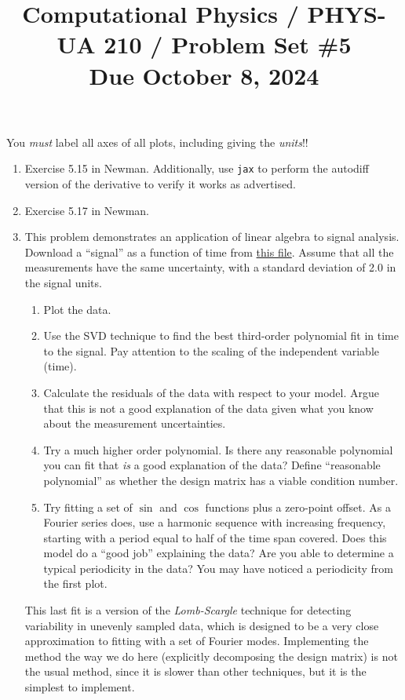\documentclass[11pt, preprint]{aastex}
\begin{document}
\title{\bf Computational Physics / PHYS-UA 210 / Problem Set \#5
\\ Due October 8, 2024 }

You {\it must} label all axes of all plots, including giving the {\it
  units}!!

\begin{enumerate}
  \item Exercise 5.15 in Newman. Additionally, use {\tt jax} to
    perform the autodiff version of the derivative to verify it works
    as advertised.
  \item Exercise 5.17 in Newman.
  \item This problem demonstrates an application of linear algebra to
    signal analysis. Download a ``signal'' as a function of time from
    \href{https://github.com/blanton144/computational-grad/blob/main/data/signal.dat}{this
      file}. Assume that all the measurements have the same
    uncertainty, with a standard deviation of 2.0 in the signal units.
    \begin{enumerate}
      \item Plot the data.
      \item Use the SVD technique to find the best third-order
        polynomial fit in time to the signal. Pay attention to the
        scaling of the independent variable (time).
      \item Calculate the residuals of the data with respect to your
        model. Argue that this is not a good explanation of the data
        given what you know about the measurement uncertainties.
      \item Try a much higher order polynomial. Is there any
        reasonable polynomial you can fit that {\it is} a good
        explanation of the data? Define ``reasonable polynomial'' as
        whether the design matrix has a viable condition number.
      \item Try fitting a set of $\sin$ and $\cos$ functions plus a
        zero-point offset. As a Fourier series does, use a harmonic
        sequence with increasing frequency, starting with a period
        equal to half of the time span covered. Does this model do a
        ``good job'' explaining the data? Are you able to determine a
        typical periodicity in the data? You may have noticed a
        periodicity from the first plot.
    \end{enumerate}
    This last fit is a version of the {\it Lomb-Scargle} technique for
    detecting variability in unevenly sampled data, which is designed
    to be a very close approximation to fitting with a set of Fourier
    modes. Implementing the method the way we do here (explicitly
    decomposing the design matrix) is not the usual method, since it
    is slower than other techniques, but it is the simplest to
    implement.
\end{enumerate}
\end{document}
